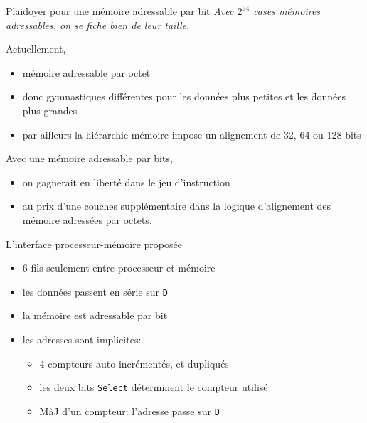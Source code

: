 \documentclass[slidetop,11pt,table]{beamer}
\begin{document}
\begin{frame}{Plaidoyer pour une mémoire adressable par bit}
  \emph{Avec $2^{64}$  cases mémoires adressables, on se fiche bien de leur taille.}

  \vfill
  Actuellement,
  \begin{itemize}
  \item mémoire adressable par octet
  \item donc gymnastiques différentes pour les données plus petites et les données plus grandes
  \item par ailleurs la hiérarchie mémoire impose un alignement de 32, 64 ou 128 bits 
  \end{itemize}

  Avec une mémoire adressable par bits,
  \begin{itemize}
  \item on gagnerait en liberté dans le jeu d'instruction
  \item au prix d'une couches supplémentaire dans la logique d'alignement des mémoire adressées par octets.
  \end{itemize}
\end{frame}


\begin{frame}{L'interface processeur-mémoire proposée}
  \begin{figure}[b]
    \begin{center}
      \scalebox{0.8}{\proco}
    \end{center}
  \end{figure}
  \begin{itemize}
  \item 6 fils seulement entre processeur et mémoire
  \item les données passent en série sur \texttt{D}
  \item la mémoire est adressable par bit
  \item les adresses sont implicites:
    \begin{itemize}
    \item 4 compteurs auto-incrémentés, et dupliqués
    \item les deux bits \texttt{Select} déterminent le compteur utilisé
    \item MàJ d'un compteur: l'adresse passe sur  \texttt{D}
    \end{itemize}
  \end{itemize}
\end{frame}
\end{document}
